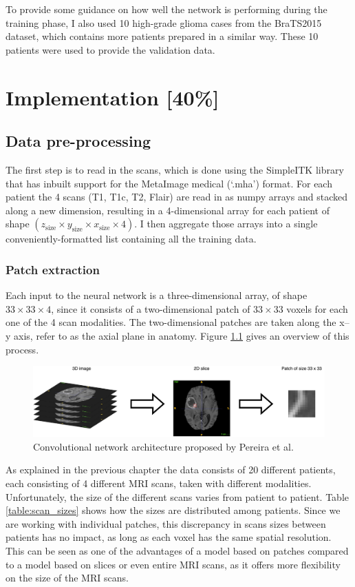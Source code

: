 \documentclass[12pt,a4paper,twoside,openright]{report}
\begin{document}
To provide some guidance on how well the network is performing during the training phase, I also used 10 high-grade glioma cases from the BraTS2015 dataset, which contains more patients prepared in a similar way. These 10 patients were used to provide the validation data.

\chapter{Implementation [40\%]}

\section{Data pre-processing}
The first step is to read in the scans, which is done using the SimpleITK library that has inbuilt support for the MetaImage medical (`.mha') format. For each patient the 4 scans (T1, T1c, T2, Flair) are read in as numpy arrays and stacked along a new dimension, resulting in a 4-dimensional array for each patient of shape $(z_{\text{size}} \times y_{\text{size}} \times x_{\text{size}} \times 4)$. I then aggregate those arrays into a single conveniently-formatted list containing all the training data.

\subsection{Patch extraction}
Each input to the neural network is a three-dimensional array, of shape $33 \times 33 \times 4$, since it consists of a two-dimensional patch of $33 \times 33$ voxels for each one of the 4 scan modalities. The two-dimensional patches are taken along the x--y axis, refer to as the axial plane in anatomy. Figure \ref{fig:patch_extraction} gives an overview of this process.

\begin{figure}
	\centering
	\includegraphics[scale=0.43]{patch_extraction}
	\caption{Convolutional network architecture proposed by Pereira et al.}
	\label{fig:patch_extraction}
\end{figure}

 
As explained in the previous chapter the data consists of 20 different patients, each consisting of 4 different MRI scans, taken with different modalities. Unfortunately, the size of the different scans varies from patient to patient. Table \ref{table:scan_sizes} shows how the sizes are distributed among patients. Since we are working with individual patches, this discrepancy in scans sizes between patients has no impact, as long as each voxel has the same spatial resolution. This can be seen as one of the advantages of a model based on patches compared to a model based on slices or even entire MRI scans, as it offers more flexibility on the size of the MRI scans.
\end{document}
